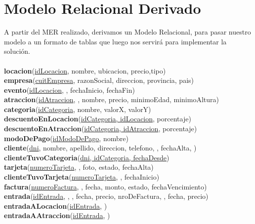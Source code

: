 \section{Modelo Relacional Derivado}
A partir del MER realizado, derivamos un Modelo Relacional, para pasar 
nuestro modelo a un formato de tablas que luego nos servirá para implementar 
la solución. \\
\\
\textbf{locacion}(\underline{idLocacion}, nombre, ubicacion, precio,tipo) \\
\textbf{empresa}(\underline{cuitEmpresa}, razonSocial, direccion, provincia, pais) \\
\textbf{evento}(\underline{idLocacion}, , fechaInicio, fechaFin) \\
\textbf{atraccion}(\underline{idAtraccion}, , nombre, precio, minimoEdad, minimoAltura) \\
\textbf{categoria}(\underline{idCategoria}, nombre, valorX, valorY) \\
\textbf{descuentoEnLocacion}(\underline{idCategoria, idLocacion}, porcentaje) \\
\textbf{descuentoEnAtraccion}(\underline{idCategoria, idAtraccion}, porcentaje) \\
\textbf{modoDePago}(\underline{idModoDePago}, nombre) \\
\textbf{cliente}(\underline{dni}, nombre, apellido, direccion, telefono, , fechaAlta, ) \\
\textbf{clienteTuvoCategoria}(\underline{dni, idCategoria, fechaDesde}) \\
\textbf{tarjeta}(\underline{numeroTarjeta}, , foto, estado, fechaAlta) \\
\textbf{clienteTuvoTarjeta}(\underline{numeroTarjeta}, , fechaInicio) \\
\textbf{factura}(\underline{numeroFactura}, , fecha, monto, estado, fechaVencimiento) \\
\textbf{entrada}(\underline{idEntrada}, , , fecha, precio, nroDeFactura, , fecha, precio) \\
\textbf{entradaALocacion}(\underline{idEntrada}, ) \\
\textbf{entradaAAtraccion}(\underline{idEntrada}, ) \\